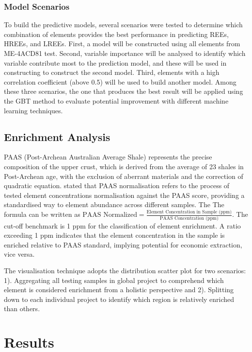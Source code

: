 \documentclass[11pt,a4paper,]{article}
\begin{document}
\subsubsection{Model Scenarios}\label{model-scenarios}

To build the predictive models, several scenarios were tested to determine which combination of elements provides the best performance in predicting REEs, HREEs, and LREEs. First, a model will be constructed using all elements from ME-4ACD81 test. Second, variable importance will be analysed to identify which variable contribute most to the prediction model, and these will be used in constructing to construct the second model. Third, elements with a high correlation coefficient (above 0.5) will be used to build another model. Among these three scenarios, the one that produces the best result will be applied using the GBT method to evaluate potential improvement with different machine learning techniques.

\subsection{Enrichment Analysis}\label{enrichment-analysis}

PAAS (Post-Archean Australian Average Shale) represents the precise composition of the upper crust, which is derived from the average of 23 shales in Post-Archean age, with the exclusion of aberrant materials and the correction of quadratic equation. \textcite{McLennan1989} stated that PAAS normalisation refers to the process of tested element concentrations normalisation against the PAAS score, providing a standardised way to element abundance across different samples. The The formula can be written as \(\text{PAAS Normalized}=\frac{ \text{Element Concentration in Sample (ppm)}}{\text{PAAS Concentration (ppm)}}\). The cut-off benchmark is 1 ppm for the classification of element enrichment. A ratio exceeding 1 ppm indicates that the element concentration in the sample is enriched relative to PAAS standard, implying potential for economic extraction, vice versa.

The visualisation technique adopts the distribution scatter plot for two scenarios: 1). Aggregating all testing samples in global project to comprehend which element is considered enrichment from a holistic perspective and 2). Splitting down to each individual project to identify which region is relatively enriched than others.

\section{Results}\label{results}
\end{document}
